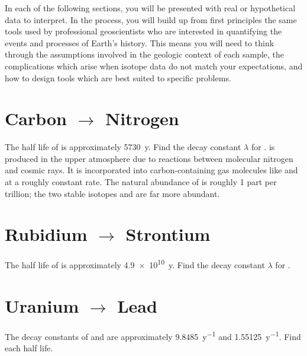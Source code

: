 \documentclass[addpoints, 12pt]{exam}
\begin{document}
In each of the following sections, you will be presented with real or hypothetical data to interpret. In the process, you will build up from first principles the same tools used by professional geoscientists who are interested in quantifying the events and processes of Earth's history. This means you will need to think through the assumptions involved in the geologic context of each sample, the complications which arise when isotope data do not match your expectations, and how to design tools which are best suited to specific problems.

\section{Carbon $\rightarrow$ Nitrogen}
\begin{questions}
\question The half life of  is approximately \qty{5730}{y}. Find the decay constant $\lambda$ for .
\question {} is produced in the upper atmosphere due to reactions between molecular nitrogen and cosmic rays. It is incorporated into carbon-containing gas molecules like  and  at a roughly constant rate. The natural abundance of  is roughly 1 part per trillion; the two stable isotopes  and  are far more abundant.
\end{questions}
\section{Rubidium $\rightarrow$ Strontium}
\begin{questions}
\question The half life of  is approximately \qty{4.9e10}{y}. Find the decay constant $\lambda$ for .
\end{questions}
\section{Uranium $\rightarrow$ Lead}
\begin{questions}
\question The decay constants of  and  are approximately \qty{9.8485}{y\tothe {-1}} and \qty{1.55125}{y\tothe {-1}}. Find each half life.
\end{questions}
\end{document}
